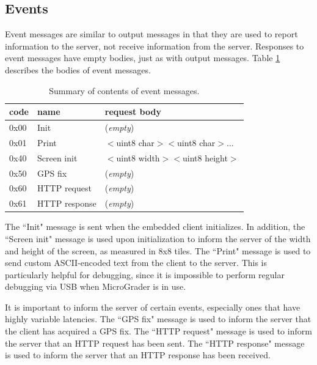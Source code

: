 \documentclass[12pt]{article}
\begin{document}
\begin{appendices}
\subsection{Events}
\label{sec:event-messages}
Event messages are similar to output messages in that they are used to report information to the server, not receive information from the server.  Responses to event messages have empty bodies, just as with output messages.  Table \ref{table:event-messages} describes the bodies of event messages.

\begin{table}[ht]
\begin{center}
\begin{tabular}{l l l}
code & name & request body \\ \hline
0x00 & Init & (\textit{empty}) \\
0x01 & Print & $<$uint8 char$>$$<$uint8 char$>$... \\
0x40 & Screen init & $<$uint8 width$>$$<$uint8 height$>$ \\
0x50 & GPS fix & (\textit{empty}) \\
0x60 & HTTP request & (\textit{empty}) \\
0x61 & HTTP response & (\textit{empty}) \\ \hline
\end{tabular}
\caption{Summary of contents of event messages.}
\label{table:event-messages}
\end{center}
\end{table}

The ``Init" message is sent when the embedded client initializes.  In addition, the ``Screen init" message is used upon initialization to inform the server of the width and height of the screen, as measured in 8x8 tiles.  The ``Print" message is used to send custom ASCII-encoded text from the client to the server.  This is particularly helpful for debugging, since it is impossible to perform regular debugging via USB when MicroGrader is in use.

It is important to inform the server of certain events, especially ones that have highly variable latencies.  The ``GPS fix" message is used to inform the server that the client has acquired a GPS fix.  The ``HTTP request" message is used to inform the server that an HTTP request has been sent.  The ``HTTP response" message is used to inform the server that an HTTP response has been received.

\clearpage

\end{appendices}
\end{document}
